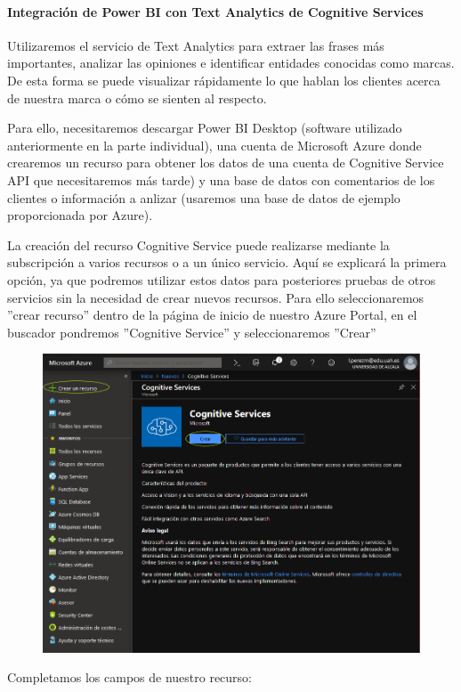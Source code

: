 \documentclass[runningheads]{llncs}
\begin{document}
\paragraph{Integración de Power BI con Text Analytics de Cognitive Services}
Utilizaremos el servicio de Text Analytics para extraer las frases más importantes, analizar las opiniones e identificar entidades conocidas como marcas. De esta forma se puede visualizar rápidamente lo que hablan los clientes acerca de nuestra marca o cómo se sienten al respecto.

Para ello, necesitaremos descargar Power BI Desktop (software utilizado anteriormente en la parte individual), una cuenta de Microsoft Azure donde crearemos un recurso para obtener los datos de una cuenta de Cognitive Service API que necesitaremos más tarde) y una base de datos con comentarios de los clientes o información a anlizar (usaremos una base de datos de ejemplo proporcionada por Azure).

La creación del recurso Cognitive Service puede realizarse mediante la subscripción a varios recursos o a un único servicio. Aquí se explicará la primera opción, ya que podremos utilizar estos datos para posteriores pruebas de otros servicios sin la necesidad de crear nuevos recursos. Para ello seleccionaremos ''crear recurso'' dentro de la página de inicio de nuestro Azure Portal, en el buscador pondremos ''Cognitive Service'' y seleccionaremos ''Crear''

\begin{figure}[H]

\includegraphics[scale = 0.25]{./IA/AZURE/crearRecursoCS.png}
\end{figure}
\newpage Completamos los campos de nuestro recurso:
\end{document}
